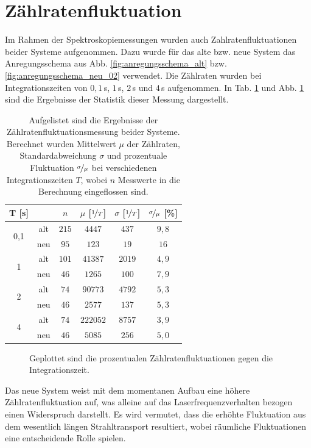 \section{Zählratenfluktuation}\label{sec:countraten_fluktuation}
Im Rahmen der Spektroskopiemessungen wurden auch Zahlratenfluktuationen beider
Systeme aufgenommen. Dazu wurde für das alte bzw. neue System das
Anregungsschema aus Abb. \ref{fig:anregungsschema_alt} bzw.
\ref{fig:anregungsschema_neu_02} verwendet. Die Zählraten wurden bei
Integrationszeiten von $0,1\,$s, $1\,$s, $2\,$s und $4\,$s aufgenommen.
In Tab. \ref{tab:countraten_fluktuationen} und Abb.
\ref{fig:countraten_fluktuationen} sind die Ergebnisse der Statistik dieser
Messung dargestellt.
\begin{table}[h]
	\begin{tabular}{cc|cccc}
		\toprule
		\multicolumn{1}{C{0.07\textwidth}}{T [s]} &
		\multicolumn{1}{C{0.07\textwidth}}{} &
		\multicolumn{1}{C{0.16\textwidth}}{$n$} &
		\multicolumn{1}{C{0.16\textwidth}}{$\mu$ [$\nicefrac{1}{T}$]} &
		\multicolumn{1}{C{0.16\textwidth}}{$\sigma$ [$\nicefrac{1}{T}$]} &
		\multicolumn{1}{C{0.16\textwidth}}{$\nicefrac{\sigma}{\mu}$ [\%]}\\
		\midrule[1px]
		\hline
		\multirow{2}{*}{0,1} & alt & $215$ & $4447$ & $437$ & $9,8$ \\
		& neu & $95$ & $123$ & $19$ & $16$ \\
		\hline
		\multirow{2}{*}{1} & alt & $101$ & $41387$ & $2019$ & $4,9$ \\
		& neu & $46$ & $1265$ & $100$ & $7,9$ \\
		\hline
		\multirow{2}{*}{2} & alt & $74$ & $90773$ & $4792$ & $5,3$ \\
		& neu & $46$ & $2577$ & $137$ & $5,3$ \\
		\hline
		\multirow{2}{*}{4} & alt & $74$ & $222052$ & $8757$ & $3,9$ \\
		& neu & $46$ & $5085$ & $256$ & $5,0$ \\
		\bottomrule[1px]
	\end{tabular}
	\caption[Zählratenfluktuationen]{Aufgelistet sind die Ergebnisse der
	Zählratenfluktuationsmessung beider Systeme. Berechnet wurden Mittelwert $\mu$
	der Zählraten, Standardabweichung $\sigma$ und prozentuale Fluktuation
	$\nicefrac{\sigma}{\mu}$ bei verschiedenen Integrationszeiten $T$, wobei $n$ Messwerte in die Berechnung eingeflossen sind.}
	\label{tab:countraten_fluktuationen}
\end{table}
\begin{figure}[h]
 	\centering
 	\footnotesize
	
	\caption[Zählratenfluktuationen]{Geplottet sind die
	prozentualen Zählratenfluktuationen gegen die Integrationszeit.}
	\label{fig:countraten_fluktuationen}
\end{figure}
Das neue System weist mit dem momentanen Aufbau eine höhere Zählratenfluktuation
auf, was alleine auf das Laserfrequenzverhalten bezogen einen Widerspruch
darstellt. Es wird vermutet, dass die erhöhte Fluktuation aus dem wesentlich
längen Strahltransport resultiert, wobei räumliche Fluktuationen eine
entscheidende Rolle spielen.
